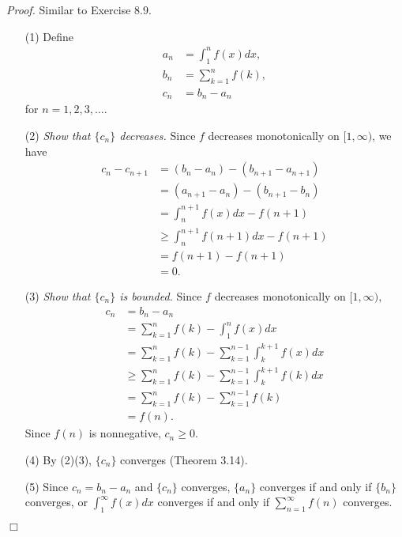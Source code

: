 \documentclass{article}
\begin{document}
\emph{Proof.}
Similar to Exercise 8.9.
\begin{enumerate}
\item[(1)]
Define
\begin{align*}
  a_n &= \int_{1}^{n} f(x) dx, \\
  b_n &= \sum_{k=1}^{n} f(k), \\
  c_n &= b_n - a_n
\end{align*}
for $n = 1,2,3,\ldots$.

\item[(2)]
\emph{Show that $\{c_n\}$ decreases.}
Since $f$ decreases monotonically on $[1,\infty)$, we have
\begin{align*}
  c_n - c_{n+1}
  &= (b_{n} - a_{n}) - (b_{n+1} - a_{n+1}) \\
  &= (a_{n+1} - a_{n}) - (b_{n+1} - b_{n}) \\
  &= \int_{n}^{n+1} f(x) dx - f(n+1) \\
  &\geq \int_{n}^{n+1} f(n+1) dx - f(n+1) \\
  &= f(n+1) - f(n+1) \\
  &= 0.
\end{align*}

\item[(3)]
\emph{Show that $\{c_n\}$ is bounded.}
Since $f$ decreases monotonically on $[1,\infty)$,
\begin{align*}
  c_{n}
  &= b_n - a_n \\
  &= \sum_{k=1}^{n} f(k) - \int_{1}^{n} f(x) dx \\
  &= \sum_{k=1}^{n} f(k) - \sum_{k=1}^{n-1} \int_{k}^{k+1} f(x) dx \\
  &\geq \sum_{k=1}^{n} f(k) - \sum_{k=1}^{n-1} \int_{k}^{k+1} f(k) dx \\
  &= \sum_{k=1}^{n} f(k) - \sum_{k=1}^{n-1} f(k) \\
  &= f(n).
\end{align*}
Since $f(n)$ is nonnegative, $c_n \geq 0$.

\item[(4)]
By (2)(3), $\{c_n\}$ converges (Theorem 3.14).

\item[(5)]
Since $c_n = b_n - a_n$ and $\{c_n\}$ converges,
$\{a_n\}$ converges if and only if $\{b_n\}$ converges,
or $\int_1^{\infty} f(x) dx$ converges if and only if
$\sum_{n=1}^{\infty} f(n)$ converges.
\end{enumerate}
$\Box$ \\\\
\end{document}
